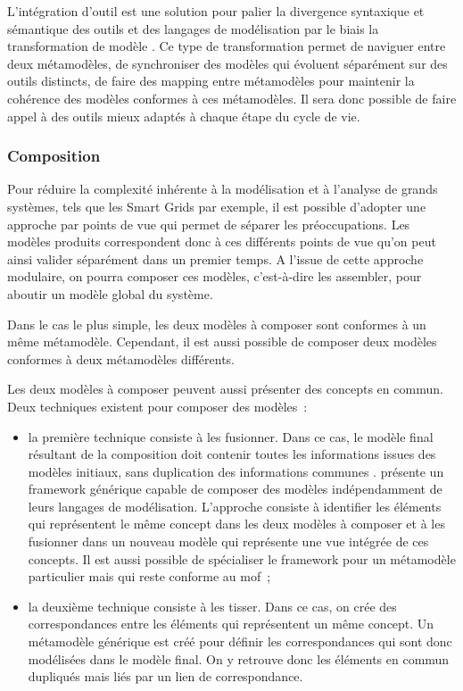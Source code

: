 L'intégration d'outil est une solution pour palier la divergence syntaxique et 
sémantique des outils et des langages de modélisation par le biais la 
transformation de modèle \cite{tratt2005model}. Ce type de transformation permet 
de naviguer entre deux métamodèles, de synchroniser des modèles qui évoluent 
séparément sur des outils distincts, de faire des mapping entre métamodèles pour 
maintenir la cohérence des modèles conformes à ces métamodèles. Il sera donc 
possible de faire appel à des outils mieux adaptés à chaque étape du cycle de 
vie.

\subsubsection{Composition}

Pour réduire la complexité inhérente à la modélisation et à l'analyse de grands 
systèmes, tels que les Smart Grids par exemple, il est possible d'adopter une 
approche par points de vue qui permet de séparer les préoccupations. Les modèles 
produits correspondent donc à ces différents points de vue qu'on peut ainsi 
valider séparément dans un premier temps. A l'issue de cette approche modulaire, 
on pourra composer ces modèles, c'est-à-dire les assembler, pour aboutir un 
modèle global du système.

Dans le cas le plus simple, les deux modèles à composer sont conformes à un même 
métamodèle. Cependant, il est aussi possible de composer deux modèles conformes 
à deux métamodèles différents. 

Les deux modèles à composer peuvent aussi présenter des concepts en commun. Deux 
techniques existent pour composer des modèles~:

\begin{itemize}
\item la première technique consiste à les fusionner. Dans ce cas, le modèle 
final résultant de la composition doit contenir toutes les informations issues 
des modèles initiaux, sans duplication des informations communes 
\cite{bezivin2006canonical}.
\cite{fleurey2008generic} présente un framework générique capable de composer 
des modèles indépendamment de leurs langages de modélisation. L'approche 
consiste à identifier les éléments qui représentent le même concept dans les 
deux modèles à composer et à les fusionner dans un nouveau modèle qui représente 
une vue intégrée de ces concepts. Il est aussi possible de spécialiser le 
framework pour un métamodèle particulier mais qui reste conforme au \gls{mof}~;

\item la deuxième technique consiste à les tisser. Dans ce cas, on crée des 
correspondances entre les éléments qui représentent un même concept. Un 
métamodèle générique est créé pour définir les correspondances qui sont donc 
modélisées dans le modèle final. On y retrouve donc les éléments en commun 
dupliqués mais liés par un lien de correspondance. 
\end{itemize}

